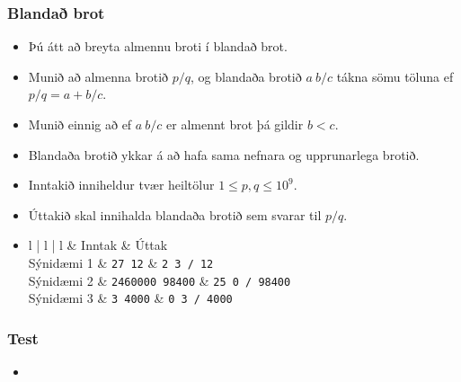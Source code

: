 \documentclass{beamer}
\newcommand\env[2]
{
	\begin{#1}
	#2
	\end{#1}
}
\begin{document}
\env{frame}
{
	\frametitle{Blandað brot}
	\env{itemize}
	{
		\item<1-> Þú átt að breyta almennu broti í blandað brot.
		\item<2-> Munið að almenna brotið $p/q$, og blandaða brotið $a\ b/c$ tákna sömu töluna ef $p/q = a + b/c$.
		\item<3-> Munið einnig að ef $a\ b/c$ er almennt brot þá gildir $b < c$.
		\item<4-> Blandaða brotið ykkar á að hafa sama nefnara og upprunarlega brotið.
		\item<5-> Inntakið inniheldur tvær heiltölur $1 \leq p, q \leq 10^9$.
		\item<6-> Úttakið skal innihalda blandaða brotið sem svarar til $p/q$.
		\item<7->
		\env{tabular}
		{
			{l | l | l}
			& Inntak & Úttak\\
			\hline
			Sýnidæmi 1 & \texttt{27 12} & \texttt{2 3 / 12}\\
			Sýnidæmi 2 & \texttt{2460000 98400} & \texttt{25 0 / 98400}\\
			Sýnidæmi 3 & \texttt{3 4000} & \texttt{0 3 / 4000}\\
		}
	}
}

\env{frame}
{
	\frametitle{Test}
	\env{itemize}
	{
		\item<1->
	}
}
\end{document}
